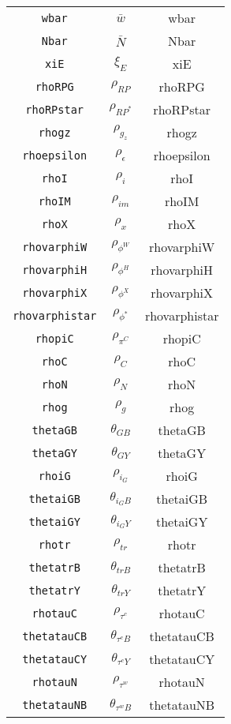 \begin{center}
\begin{longtable}{ccc}
\texttt{wbar} & $\bar{w}$ & wbar\\
\texttt{Nbar} & $\bar{N}$ & Nbar\\
\texttt{xiE} & $\xi_E$ & xiE\\
\texttt{rhoRPG} & $\rho_{RP}$ & rhoRPG\\
\texttt{rhoRPstar} & $\rho_{RP^*}$ & rhoRPstar\\
\texttt{rhogz} & $\rho_{g_z}$ & rhogz\\
\texttt{rhoepsilon} & $\rho_{\epsilon}$ & rhoepsilon\\
\texttt{rhoI} & $\rho_{i}$ & rhoI\\
\texttt{rhoIM} & $\rho_{im}$ & rhoIM\\
\texttt{rhoX} & $\rho_{x}$ & rhoX\\
\texttt{rhovarphiW} & $\rho_{\phi^W}$ & rhovarphiW\\
\texttt{rhovarphiH} & $\rho_{\phi^H}$ & rhovarphiH\\
\texttt{rhovarphiX} & $\rho_{\phi^X}$ & rhovarphiX\\
\texttt{rhovarphistar} & $\rho_{\phi^*}$ & rhovarphistar\\
\texttt{rhopiC} & $\rho_{\pi^C}$ & rhopiC\\
\texttt{rhoC} & $\rho_{C}$ & rhoC\\
\texttt{rhoN} & $\rho_{N}$ & rhoN\\
\texttt{rhog} & $\rho_{g}$ & rhog\\
\texttt{thetaGB} & $\theta_{GB}$ & thetaGB\\
\texttt{thetaGY} & $\theta_{GY}$ & thetaGY\\
\texttt{rhoiG} & $\rho_{i_G}$ & rhoiG\\
\texttt{thetaiGB} & $\theta_{i_GB}$ & thetaiGB\\
\texttt{thetaiGY} & $\theta_{i_GY}$ & thetaiGY\\
\texttt{rhotr} & $\rho_{tr}$ & rhotr\\
\texttt{thetatrB} & $\theta_{trB}$ & thetatrB\\
\texttt{thetatrY} & $\theta_{trY}$ & thetatrY\\
\texttt{rhotauC} & $\rho_{\tau^c}$ & rhotauC\\
\texttt{thetatauCB} & $\theta_{\tau^cB}$ & thetatauCB\\
\texttt{thetatauCY} & $\theta_{\tau^cY}$ & thetatauCY\\
\texttt{rhotauN} & $\rho_{\tau^w}$ & rhotauN\\
\texttt{thetatauNB} & $\theta_{\tau^wB}$ & thetatauNB\\

\end{longtable}
\end{center}
